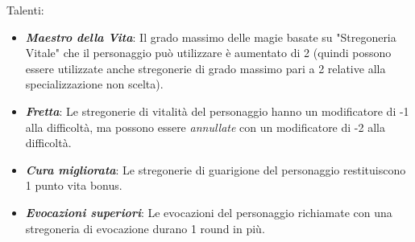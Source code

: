 \documentclass[../manuale_main.tex]{subfiles}
\begin{document}
Talenti:

\begin{itemize}
\item \textbf{\textit{Maestro della Vita}}: Il grado massimo delle magie basate su "Stregoneria Vitale" che il personaggio può utilizzare è aumentato di 2 (quindi possono essere utilizzate anche stregonerie di grado massimo pari a 2 relative alla specializzazione non scelta).
\item \textbf{\textit{Fretta}}: Le stregonerie di vitalità del personaggio hanno un modificatore di -1 alla difficoltà, ma possono essere \textit{annullate} con un modificatore di -2 alla difficoltà.
\item \textbf{\textit{Cura migliorata}}: Le stregonerie di guarigione del personaggio restituiscono 1 punto vita bonus.
\item \textbf{\textit{Evocazioni superiori}}: Le evocazioni del personaggio richiamate con una stregoneria di evocazione durano 1 round in più.
\end{itemize}
\end{document}
